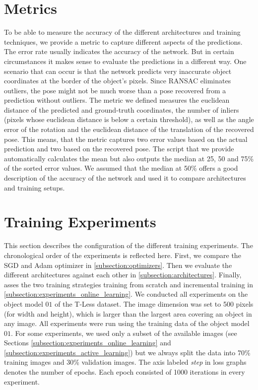 \section{Metrics}

To be able to measure the accuracy of the different architectures and training techniques, we provide a metric to capture different aspects of the predictions. The error rate usually indicates the accuracy of the network. But in certain circumstances it makes sense to evaluate the predictions in a different way. One scenario that can occur is that the network predicts very inaccurate object coordinates at the border of the object's pixels. Since RANSAC eliminates outliers, the pose might not be much worse than a pose recovered from a prediction without outliers. The metric we defined measures the euclidean distance of the predicted and ground-truth coordinates, the number of inliers (pixels whose euclidean distance is below a certain threshold), as well as the angle error of the rotation and the euclidean distance of the translation of the recovered pose. This means, that the metric captures two error values based on the actual prediction and two based on the recovered pose. The script that we provide automatically calculates the mean but also outputs the median at 25, 50 and 75\% of the sorted error values. We assumed that the median at 50\% offers a good description of the accuracy of the network and used it to compare architectures and training setups.

\section{Training Experiments}

This section describes the configuration of the different training experiments. The chronological order of the experiments is reflected here. First, we compare the SGD and Adam optimizer in \ref{subsection:optimizers}. Then we evaluate the different architectures against each other in \ref{subsection:architectures}. Finally, asses the two training strategies training from scratch and incremental training in \ref{subsection:experiments_online_learning}. We conducted all experiments on the object model $01$ of the T-Less dataset. The image dimension was set to 500 pixels (for width and height), which is larger than the largest area covering an object in any image. All experiments were run using the training data of the object model $01$. For some experiments, we used only a subset of the available images (see Sections \ref{subsection:experiments_online_learning} and \ref{subsection:experiments_active_learning}) but we always split the data into 70\% training images and 30\% validation images. The axis labeled \textit{step} in loss graphs denotes the number of epochs. Each epoch consisted of 1000 iterations in every experiment.

